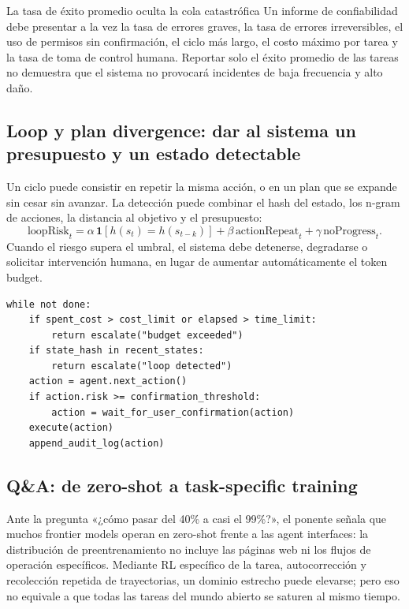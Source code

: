 \documentclass[a4paper]{article}
\begin{document}
\begin{warningbox}{La tasa de éxito promedio oculta la cola catastrófica}
Un informe de confiabilidad debe presentar a la vez la tasa de errores graves, la tasa de errores irreversibles, el uso de permisos sin confirmación, el ciclo más largo, el costo máximo por tarea y la tasa de toma de control humana. Reportar solo el éxito promedio de las tareas no demuestra que el sistema no provocará incidentes de baja frecuencia y alto daño.
\end{warningbox}

\subsection{Loop y plan divergence: dar al sistema un presupuesto y un estado detectable}

Un ciclo puede consistir en repetir la misma acción, o en un plan que se expande sin cesar sin avanzar. La detección puede combinar el hash del estado, los n-gram de acciones, la distancia al objetivo y el presupuesto:
\[
\text{loopRisk}_t=
\alpha\,\mathbf{1}[h(s_t)=h(s_{t-k})]
+\beta\,\text{actionRepeat}_t
+\gamma\,\text{noProgress}_t.
\]
Cuando el riesgo supera el umbral, el sistema debe detenerse, degradarse o solicitar intervención humana, en lugar de aumentar automáticamente el token budget.

\begin{lstlisting}[caption={Ciclo de ejecución con presupuesto, detección de repeticiones y toma de control humana}]
while not done:
    if spent_cost > cost_limit or elapsed > time_limit:
        return escalate("budget exceeded")
    if state_hash in recent_states:
        return escalate("loop detected")
    action = agent.next_action()
    if action.risk >= confirmation_threshold:
        action = wait_for_user_confirmation(action)
    execute(action)
    append_audit_log(action)
\end{lstlisting}

\subsection{Q\&A: de zero-shot a task-specific training}

Ante la pregunta «¿cómo pasar del 40\% a casi el 99\%?», el ponente señala que muchos frontier models operan en zero-shot frente a las agent interfaces: la distribución de preentrenamiento no incluye las páginas web ni los flujos de operación específicos. Mediante RL específico de la tarea, autocorrección y recolección repetida de trayectorias, un dominio estrecho puede elevarse; pero eso no equivale a que todas las tareas del mundo abierto se saturen al mismo tiempo.
\end{document}
